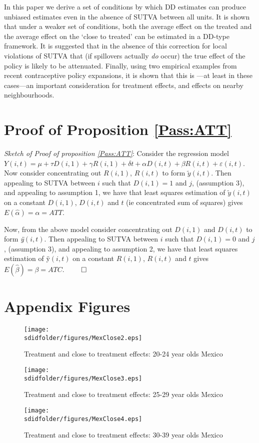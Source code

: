 In this paper we derive a set of conditions by which DD estimates can produce 
unbiased estimates even in the absence of SUTVA between all units.  It is shown
that under a weaker set of conditions, both the average effect on the treated
and the average effect on the `close to treated' can be estimated in a DD-type
framework.  It is suggested that in the absence of this correction for local 
violations of SUTVA that (if spillovers actually \emph{do} occur) the true 
effect of the policy is likely to be attenuated.  Finally, using two empirical 
examples from recent contraceptive policy expansions, it is shown that this is%
---at least in these cases---an important consideration for treatment effects, 
and effects on nearby neighbourhoods.


\newpage

\appendix
\section{Proof of Proposition \ref{Pass:ATT}}
\emph{Sketch of Proof of proposition \ref{Pass:ATT}}: Consider the regression 
model $Y(i,t)=\mu+\tau D(i,1) + \gamma R(i,1) + \delta t + \alpha D(i,t) + 
\beta R(i,t) + \varepsilon(i,t)$.  Now consider concentrating out $R(i,1)$, 
$R(i,t)$ to form $\tilde{y}(i,t)$.  Then appealing to SUTVA between $i$ such 
that $D(i,1)=1$ and $j$, (assumption 3), and appealing to assumption 1, we have 
that least squares estimation of $\tilde{y}(i,t)$ on a constant $D(i,1)$,
$D(i,t)$ and $t$ (ie concentrated sum of squares) gives
$E(\hat\alpha)=\alpha=ATT$.  


Now, from the above model consider concentrating out $D(i,1)$ and $D(i,t)$
to form \emph{\"{y}}$(i,t)$.  Then appealing to SUTVA between $i$ such 
that $D(i,1)=0$ and $j$, (assumption 3), and appealing to assumption 2, we 
have that least squares estimation of \"{y}$(i,t)$ on a constant $R(i,1)$,
$R(i,t)$ and $t$ gives $E(\hat\beta)=\beta=ATC$. $\qed$

\clearpage

\section{Appendix Figures}
\label{Sscn:Agraphs}
\begin{figure}[htpb!]
\texttt{[image: \\sdidfolder/figures/MexClose2.eps]}
\caption{Treatment and close to treatment effects: 20-24 year olds Mexico}
\end{figure}
\begin{figure}[htpb!]
\texttt{[image: \\sdidfolder/figures/MexClose3.eps]}
\caption{Treatment and close to treatment effects: 25-29 year olds Mexico}
\end{figure}
\begin{figure}[htpb!]
\texttt{[image: \\sdidfolder/figures/MexClose4.eps]}
\caption{Treatment and close to treatment effects: 30-39 year olds Mexico}
\end{figure}

%
